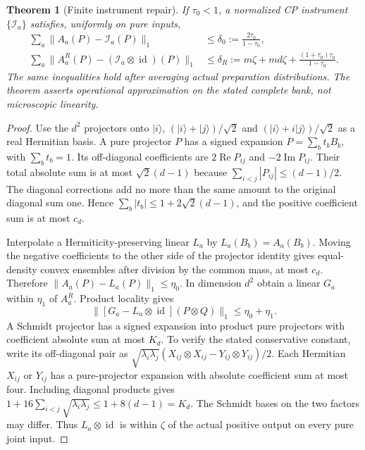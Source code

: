 \documentclass[11pt,oneside,openany]{book}
\newtheorem{theorem}{Theorem}[chapter]
\theoremstyle{definition}
\theoremstyle{remark}\newtheorem{remark}[theorem]{Remark}
\begin{document}
\begin{theorem}[Finite instrument repair]
\label{cpc:thm:repair}
If $\tau_0<1$, a normalized CP instrument $\{\mathcal I_a\}$ satisfies, uniformly on pure inputs,
\begin{align}
 \sum_a\|A_a(P)-\mathcal I_a(P)\|_1
 &\le\delta_0:=\frac{2\tau_0}{1-\tau_0},\label{cpc:eq:repairlocal}\\
 \sum_a\|A_a^R(P)-(\mathcal I_a\otimes\operatorname{id})(P)\|_1
 &\le\delta_R:=m\zeta+md\zeta+
 \frac{(1+\tau_0)\tau_0}{1-\tau_0}.
 \label{cpc:eq:repairref}
\end{align}
The same inequalities hold after averaging actual preparation distributions. The theorem asserts operational approximation on the stated complete bank, not microscopic linearity.
\end{theorem}
\begin{proof}
Use the $d^2$ projectors onto $|i\rangle$, $(|i\rangle+|j\rangle)/\sqrt2$ and $(|i\rangle+i|j\rangle)/\sqrt2$ as a real Hermitian basis. A pure projector $P$ has a signed expansion $P=\sum_b t_bB_b$, with $\sum_b t_b=1$. Its off-diagonal coefficients are $2\operatorname{Re}P_{ij}$ and $-2\operatorname{Im}P_{ij}$. Their total absolute sum is at most $\sqrt2(d-1)$ because $\sum_{i<j}|P_{ij}|\le(d-1)/2$. The diagonal corrections add no more than the same amount to the original diagonal sum one. Hence
$\sum_b|t_b|\le1+2\sqrt2(d-1)$, and the positive coefficient sum is at most $c_d$.

Interpolate a Hermiticity-preserving linear $L_a$ by $L_a(B_b)=A_a(B_b)$. Moving the negative coefficients to the other side of the projector identity gives equal-density convex ensembles after division by the common mass, at most $c_d$. Therefore $\|A_a(P)-L_a(P)\|_1\le\eta_0$. In dimension $d^2$ obtain a linear $G_a$ within $\eta_1$ of $A_a^R$. Product locality gives
\[
 \|[G_a-L_a\otimes\operatorname{id}](P\otimes Q)\|_1\le\eta_0+\eta_1.
\]
A Schmidt projector has a signed expansion into product pure projectors with coefficient absolute sum at most $K_d$. To verify the stated conservative constant, write its off-diagonal pair as
$\sqrt{\lambda_i\lambda_j}(X_{ij}\otimes X_{ij}-Y_{ij}\otimes Y_{ij})/2$.
Each Hermitian $X_{ij}$ or $Y_{ij}$ has a pure-projector expansion with absolute coefficient sum at most four. Including diagonal products gives
$1+16\sum_{i<j}\sqrt{\lambda_i\lambda_j}\le1+8(d-1)=K_d$.
The Schmidt bases on the two factors may differ. Thus $L_a\otimes\operatorname{id}$ is within $\zeta$ of the actual positive output on every pure joint input.


\end{proof}
\end{document}
